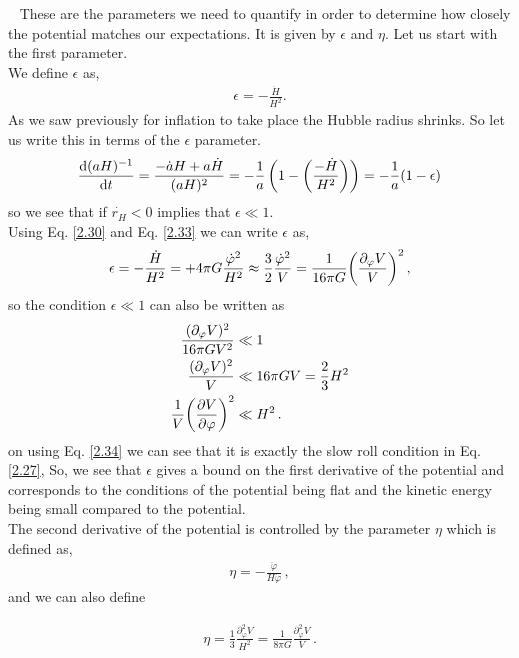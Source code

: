 \
\hspace{0.5cm} These are the parameters we need to quantify in order to determine how closely the potential matches our expectations. It is given by $\epsilon$ and $\eta$. Let us start with the first parameter.\\
We define $\epsilon$ as,
\begin{align}
    \epsilon = -\frac{\dot{H}}{H^2}. \label{2.34}
\end{align}
As we saw previously for inflation to take place the Hubble radius shrinks. So let us write this in terms of the $\epsilon$ parameter.
\begin{align}
    \dv{(aH)^{-1}}{t} = \frac{-\dot{a}H + a\dot{H}}{(aH)^2} = -\frac{1}{a}\left( 1- \left( \frac{-\dot{H}}{H^2}\right)\right) = -\frac{1}{a}(1 - \epsilon) \label{2.35}
\end{align}
so we see that if $\dot{r_H} < 0$ implies that $\epsilon \ll 1 $.\\
\hspace{0.5cm} Using Eq. \ref{2.30} and Eq. \ref{2.33} we can write $\epsilon$ as,
\begin{align}
    \epsilon = - \frac{\dot{H}}{H^2} = + 4 \pi G \frac{\dot{\varphi}^2}{H^2} \approx \frac{3}{2} \frac{\dot{\varphi}^2}{V} = \frac{1}{16 \pi G} \qty(\frac{\partial_{\varphi} V}{V})^2\,,\label{2.36}
\end{align}
so the condition $\epsilon \ll 1 $ can also be written as 
\begin{align}
    \frac{(\partial_{\varphi} V)^2}{16 \pi G V^2} &\ll 1  \\ 
    \frac{(\partial_{\varphi} V)^2}{V} &\ll 16 \pi G V = \frac{2}{3} H^2 \\ 
    \frac{1}{V} \qty(\pdv{V}{\varphi })^2 &\ll H^2\,.\label{2.39}
\end{align}
on using Eq. \ref{2.34} we can see that it is exactly the slow roll condition in Eq. \ref{2.27}, So, we see that $\epsilon$ gives a bound on the first derivative of the potential and corresponds to the conditions of the potential being flat and the kinetic energy being small compared to the potential.\\
The second derivative of the potential is controlled by the parameter $\eta$ which is defined as,
 \begin{align}
     \eta = - \frac{\ddot{\varphi}}{H \dot{\varphi}}\,, \label{2.40}
 \end{align}
 and we can also define 

\begin{align}
    \eta = \frac{1}{3} \frac{\partial^{2} _{\varphi} V}{H^2} = \frac{1}{8 \pi G} \frac{\partial^{2} _{\varphi} V}{V} \,. \label{2.41}
\end{align}

